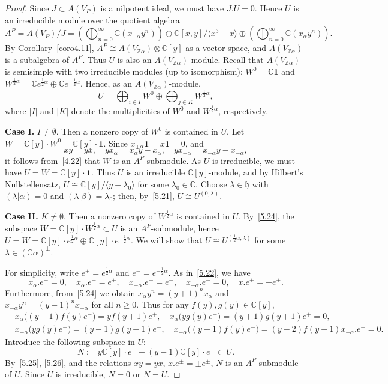 \documentclass[12pt,a4paper,reqno]{amsart}
\numberwithin{equation}{section}
\numberwithin{equation}{section}
\theoremstyle{definition}
\newcommand{\Z}{\mathbb{Z}}
\def \C {\mathbb{C}}
\def\la{\lambda}
\def \al{\alpha}
\def \b {\beta}
\def \op {\oplus}
\def \vac {\mathbf{1}}
\def \h {\mathfrak{h}}
\def\o{\otimes}
\def\<{\langle}
\def\>{\rangle}
\begin{document}
	\begin{proof}
		Since $J\subset A(V_P)$ is a nilpotent ideal, we must have $J.U=0$.  
		Hence $U$ is an irreducible module over the quotient algebra 
		\[
		A^P=A(V_P)/J
		=\left(\bigoplus_{n=0}^\infty \C(x_{-\al}y^n)\right)
		\op \C[x,y]/\<x^3-x\>
		\op \left(\bigoplus_{n=0}^\infty \C(x_{\al}y^n)\right).
		\]
		By Corollary~\ref{coro4.11}, $A^P\cong A(V_{\Z\al})\o\C[y]$ as a vector space, and $A(V_{\Z\al})$ is a subalgebra of $A^P$. Thus $U$ is also an $A(V_{\Z\al})$-module.  
		Recall that $A(V_{\Z\al})$ is semisimple with two irreducible modules (up to isomorphism):
		$W^0=\C\vac$ and $W^{\frac{1}{2}\al}=\C e^{\frac{1}{2}\al}\op \C e^{-\frac{1}{2}\al}$.
		Hence, as an $A(V_{\Z\al})$-module,
		\[
		U=\bigoplus_{i\in I} W^0 \op \bigoplus_{j\in K} W^{\frac{1}{2}\al},
		\]
		where $|I|$ and $|K|$ denote the multiplicities of $W^0$ and $W^{\frac{1}{2}\al}$, respectively.  
		
		\textbf{Case I.} $I\neq\emptyset$.  
		Then a nonzero copy of $W^0$ is contained in $U$.  
		Let $W=\C[y]\cdot W^0=\C[y]\cdot\vac$.  
		Since $x_{\pm\al}\vac=x\vac=0$, and
		\begin{equation}\label{5.24}
			xy=yx,\quad yx_\al=x_\al y-x_\al,\quad yx_{-\al}=x_{-\al}y-x_{-\al},
		\end{equation}
		it follows from~\eqref{4.22} that $W$ is an $A^P$-submodule.  
		As $U$ is irreducible, we must have $U=W=\C[y]\cdot\vac$.  
		Thus $U$ is an irreducible $\C[y]$-module, and by Hilbert’s Nullstellensatz,
		$U\cong\C[y]/\<y-\la_0\>$ for some $\la_0\in\C$.  
		Choose $\la\in\h$ with $(\la|\al)=0$ and $(\la|\b)=\la_0$; then, by~\eqref{5.21},
		$U\cong U^{(0,\la)}$.
		
		\textbf{Case II.} $K\neq\emptyset$.  
		Then a nonzero copy of $W^{\frac{1}{2}\al}$ is contained in $U$.  
		By~\eqref{5.24}, the subspace $W=\C[y]\cdot W^{\frac{1}{2}\al}\subset U$ 
		is an $A^P$-submodule, hence $U=W=\C[y]\cdot e^{\frac{1}{2}\al}\op \C[y]\cdot e^{-\frac{1}{2}\al}$.  
		We will show that $U\cong U^{(\frac{1}{2}\al,\la)}$ for some $\la\in(\C\al)^\perp$.  
		
		For simplicity, write $e^+=e^{\frac{1}{2}\al}$ and $e^-=e^{-\frac{1}{2}\al}$.  
		As in~\eqref{5.22}, we have
		\[
		x_\al.e^+=0,\quad x_\al.e^-=e^+,\quad 
		x_{-\al}.e^+=e^-,\quad x_{-\al}.e^-=0,\quad
		x.e^{\pm}=\pm e^{\pm}.
		\]
		Furthermore, from~\eqref{5.24} we obtain 
		$x_\al y^n=(y+1)^n x_\al$ and $x_{-\al}y^n=(y-1)^n x_{-\al}$ for all $n\ge0$.  
		Thus for any $f(y),g(y)\in\C[y]$,
		\begin{align}
			&x_\al\big((y-1)f(y)e^-\big)=y f(y+1)e^+,\quad
			x_\al\big(y g(y)e^+\big)=(y+1)g(y+1)e^+=0,\label{5.25}\\
			&x_{-\al}\big(y g(y)e^+\big)=(y-1)g(y-1)e^-,\quad
			x_{-\al}\big((y-1)f(y)e^-\big)=(y-2)f(y-1)x_{-\al}.e^-=0.\label{5.26}
		\end{align}
		Introduce the following subspace in $U$: 
		\[
		N:=y\C[y]\cdot e^+ + (y-1)\C[y]\cdot e^- \subset U.
		\]
		By~\eqref{5.25}, \eqref{5.26}, and the relations $xy=yx$, $x.e^{\pm}=\pm e^{\pm}$,
		$N$ is an $A^P$-submodule of $U$.  
		Since $U$ is irreducible, $N=0$ or $N=U$.
		

\end{proof}
\end{document}
